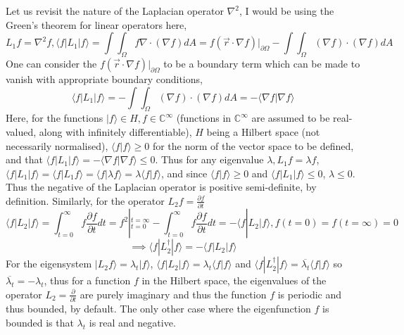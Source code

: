 \documentclass{article}
\begin{document}
Let us revisit the nature of the Laplacian operator $\nabla^2$, I would be using the Green's theorem for linear operators here,
\begin{equation*}
L_1 f = \nabla^2 f, \langle f|L_1|f \rangle = \int\int_{\Omega} f \nabla\cdot(\nabla f) dA = f (\vec{r}\cdot\nabla f)|_{\partial\Omega} - \int\int_{\Omega} (\nabla f)\cdot(\nabla f) dA
\end{equation*}
One can consider the $f (\vec{r}\cdot\nabla f)|_{\partial\Omega}$ to be a boundary term which can be made to vanish with appropriate boundary conditions,
\begin{equation*}
\langle f|L_1|f \rangle = - \int\int_{\Omega} (\nabla f)\cdot(\nabla f) dA = -\langle \nabla f|\nabla f \rangle
\end{equation*}
Here, for the functions $|f\rangle \in H, f \in \mathbb{C}^{\mathbb{\infty}}$ (functions in $\mathbb{C}^{\mathbb{\infty}}$ are assumed to be real-valued, along with infinitely differentiable), $H$ being a Hilbert space (not necessarily normalised), $\langle f|f \rangle \ge 0$ for the norm of the vector space to be defined, and that $\langle f|L_1|f \rangle = -\langle \nabla f|\nabla f \rangle \le 0$. Thus for any eigenvalue $\lambda, L_1 f = \lambda f$, $\langle f|L_1|f \rangle = \langle f|L_1 f \rangle = \langle f|\lambda f \rangle = \lambda \langle f|f \rangle$, and since $\langle f|f \rangle \ge 0$ and $\langle f|L_1|f \rangle \le 0$, $\lambda \le 0$. Thus the negative of the Laplacian operator is positive semi-definite, by definition. Similarly, for the operator $L_2 f = \frac{\partial f}{\partial t}$
\begin{equation*}
\langle f|L_2|f \rangle = \int_{t=0}^{\infty} f\frac{\partial f}{\partial t}dt = f^2|^{t=\infty}_{t=0} - \int_{t=0}^{\infty} f\frac{\partial f}{\partial t}dt = -\langle f|L_2|f \rangle, f(t=0) = f(t=\infty) = 0
\end{equation*}
\begin{equation*}
\implies \langle f|L_2^{\dagger}|f \rangle = -\langle f|L_2|f \rangle
\end{equation*}
For the eigensystem $|L_2 f\rangle = \lambda_t |f\rangle$, $\langle f|L_2|f \rangle = \lambda_t \langle f|f \rangle$ and $\langle f|L_2^{\dagger}|f \rangle = \overline{\lambda_t} \langle f|f \rangle$ so $\overline{\lambda_t} = -\lambda_t$, thus for a function $f$ in the Hilbert space, the eigenvalues of the operator $L_2 = \frac{\partial}{\partial t}$ are purely imaginary and thus the function $f$ is periodic and thus bounded, by default. The only other case where the eigenfunction $f$ is bounded is that $\lambda_t$ is real and negative. \\ \\
\end{document}

